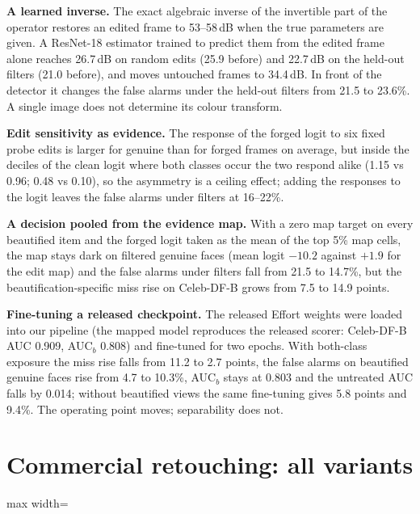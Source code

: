 \documentclass[10pt]{article}
\begin{document}
\textbf{A learned inverse.} The exact algebraic inverse of the invertible part of the operator restores an edited frame
to 53--58\,dB when the true parameters are given. A ResNet-18 estimator trained to predict them from the edited frame
alone reaches 26.7\,dB on random edits (25.9 before) and 22.7\,dB on the held-out filters (21.0 before), and moves
untouched frames to 34.4\,dB. In front of the detector it changes the false alarms under the held-out filters from 21.5
to 23.6\%. A single image does not determine its colour transform.

\textbf{Edit sensitivity as evidence.} The response of the forged logit to six fixed probe edits is larger for genuine
than for forged frames on average, but inside the deciles of the clean logit where both classes occur the two respond
alike (1.15 vs 0.96; 0.48 vs 0.10), so the asymmetry is a ceiling effect; adding the responses to the logit leaves the
false alarms under filters at 16--22\%.

\textbf{A decision pooled from the evidence map.} With a zero map target on every beautified item and the forged logit
taken as the mean of the top 5\% map cells, the map stays dark on filtered genuine faces (mean logit $-10.2$ against
$+1.9$ for the edit map) and the false alarms under filters fall from 21.5 to 14.7\%, but the beautification-specific
miss rise on Celeb-DF-B grows from 7.5 to 14.9 points.

\textbf{Fine-tuning a released checkpoint.} The released Effort weights were loaded into our pipeline (the mapped
model reproduces the released scorer: Celeb-DF-B AUC 0.909, AUC$_b$ 0.808) and fine-tuned for two epochs. With both-class
exposure the miss rise falls from 11.2 to 2.7 points, the false alarms on beautified genuine faces rise from 4.7 to
10.3\%, AUC$_b$ stays at 0.803 and the untreated AUC falls by 0.014; without beautified views the same fine-tuning gives
5.8 points and 9.4\%. The operating point moves; separability does not.

\section{Commercial retouching: all variants}
\begin{table}[h]
\centering
\caption{All trained variants on the unseen service (2,210 originals, 26,519 renders). Columns as in Table~V of the
paper.}
\label{tab:alipair_all}
\footnotesize
\begin{adjustbox}{max width=\linewidth}\end{adjustbox}
\end{table}
\end{document}
